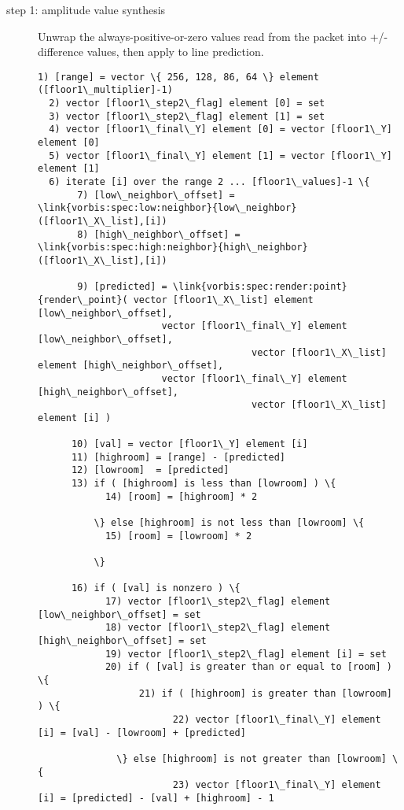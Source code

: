 \begin{description}
\item[step 1: amplitude value synthesis]

Unwrap the always-positive-or-zero values read from the packet into
+/- difference values, then apply to line prediction.

\begin{Verbatim}[commandchars=\\\{\}]
  1) [range] = vector \{ 256, 128, 86, 64 \} element ([floor1\_multiplier]-1)
  2) vector [floor1\_step2\_flag] element [0] = set
  3) vector [floor1\_step2\_flag] element [1] = set
  4) vector [floor1\_final\_Y] element [0] = vector [floor1\_Y] element [0]
  5) vector [floor1\_final\_Y] element [1] = vector [floor1\_Y] element [1]
  6) iterate [i] over the range 2 ... [floor1\_values]-1 \{
       7) [low\_neighbor\_offset] = \link{vorbis:spec:low:neighbor}{low\_neighbor}([floor1\_X\_list],[i])
       8) [high\_neighbor\_offset] = \link{vorbis:spec:high:neighbor}{high\_neighbor}([floor1\_X\_list],[i])

       9) [predicted] = \link{vorbis:spec:render:point}{render\_point}( vector [floor1\_X\_list] element [low\_neighbor\_offset],
				      vector [floor1\_final\_Y] element [low\_neighbor\_offset],
                                      vector [floor1\_X\_list] element [high\_neighbor\_offset],
				      vector [floor1\_final\_Y] element [high\_neighbor\_offset],
                                      vector [floor1\_X\_list] element [i] )

      10) [val] = vector [floor1\_Y] element [i]
      11) [highroom] = [range] - [predicted]
      12) [lowroom]  = [predicted]
      13) if ( [highroom] is less than [lowroom] ) \{
            14) [room] = [highroom] * 2

          \} else [highroom] is not less than [lowroom] \{
            15) [room] = [lowroom] * 2

          \}

      16) if ( [val] is nonzero ) \{
            17) vector [floor1\_step2\_flag] element [low\_neighbor\_offset] = set
            18) vector [floor1\_step2\_flag] element [high\_neighbor\_offset] = set
            19) vector [floor1\_step2\_flag] element [i] = set
            20) if ( [val] is greater than or equal to [room] ) \{
                  21) if ( [highroom] is greater than [lowroom] ) \{
                        22) vector [floor1\_final\_Y] element [i] = [val] - [lowroom] + [predicted]

		      \} else [highroom] is not greater than [lowroom] \{
                        23) vector [floor1\_final\_Y] element [i] = [predicted] - [val] + [highroom] - 1


\end{Verbatim}
\end{description}
